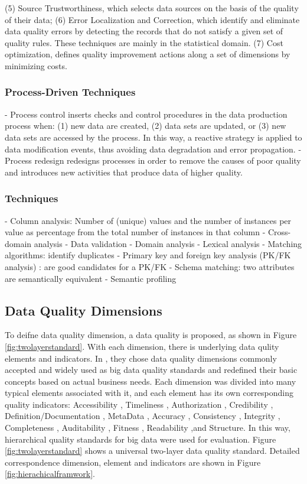 \documentclass[pdftex,english,oribibl]{llncs}
\begin{document}
(5) Source Trustworthiness, which selects data sources on the basis of the quality of their data;
(6) Error Localization and Correction, which identify and eliminate data quality errors by detecting the records that do not satisfy a given set of quality rules. These techniques are mainly in the statistical domain.
(7) Cost optimization, defines quality improvement actions along a set of dimensions by minimizing costs.

\subsubsection{Process-Driven Techniques}
- Process control inserts checks and control procedures in the data production process when: (1) new data are created, (2) data sets are updated, or (3) new data sets are accessed by the process. In this way, a reactive strategy is applied to data modification events, thus avoiding data degradation and error propagation.
- Process redesign redesigns processes in order to remove the causes of poor quality and introduces new activities that produce data of higher quality.

\subsubsection{Techniques}
 - Column analysis: Number of (unique) values and the number of instances per value as percentage from the total number of instances in that column
 - Cross-domain analysis
 - Data validation
 - Domain analysis
 - Lexical analysis
 - Matching algorithms: identify duplicates
 - Primary key and foreign key analysis (PK/FK analysis) : are good candidates for a PK/FK
 - Schema matching: two attributes are semantically equivalent
 - Semantic profiling

\subsection{Data Quality Dimensions}\label{sec:DataQualityDimensions}

To deifne data quality dimension, a data quality is proposed, as shown in Figure \ref{fig:twolayerstandard}. With each dimension, there is underlying data qulity elements and indicators.
In \citet{Cai2005ChallnegesOfDataQuality}, they chose data quality dimensions commonly accepted and widely used as big data quality standards and redefined their basic concepts based on actual business needs.
Each dimension was divided into many typical elements associated with it, and each element has its own corresponding quality indicators: Accessibility
, Timeliness
, Authorization
, Credibility
, Definition/Documentation
, MetaData
, Accuracy
, Consistency
, Integrity
, Completeness
, Auditability
, Fitness
, Readability
,and Structure.
In this way, hierarchical quality standards for big data were used for evaluation.
Figure \ref{fig:twolayerstandard} shows a universal two-layer data quality standard. Detailed correspondence dimension, element and indicators are shown in Figure \ref{fig:hierachicalframwork}.
\end{document}
